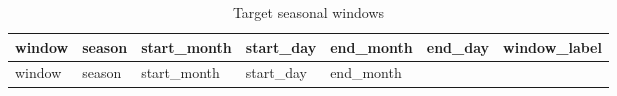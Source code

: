 \documentclass[
]{article}
\begin{document}
\begin{longtable}[]{@{}
  >{\raggedright\arraybackslash}p{}
  >{\raggedright\arraybackslash}p{}
  >{\raggedleft\arraybackslash}p{}
  >{\raggedleft\arraybackslash}p{}
  >{\raggedleft\arraybackslash}p{}
  >{\raggedleft\arraybackslash}p{}
  >{\raggedright\arraybackslash}p{}@{}}
\caption{Target seasonal windows}\tabularnewline
\toprule\noalign{}
\begin{minipage}[b]{\linewidth}\raggedright
window
\end{minipage} & \begin{minipage}[b]{\linewidth}\raggedright
season
\end{minipage} & \begin{minipage}[b]{\linewidth}\raggedleft
start\_month
\end{minipage} & \begin{minipage}[b]{\linewidth}\raggedleft
start\_day
\end{minipage} & \begin{minipage}[b]{\linewidth}\raggedleft
end\_month
\end{minipage} & \begin{minipage}[b]{\linewidth}\raggedleft
end\_day
\end{minipage} & \begin{minipage}[b]{\linewidth}\raggedright
window\_label
\end{minipage} \\
\midrule\noalign{}
\endfirsthead
\toprule\noalign{}
\begin{minipage}[b]{\linewidth}\raggedright
window
\end{minipage} & \begin{minipage}[b]{\linewidth}\raggedright
season
\end{minipage} & \begin{minipage}[b]{\linewidth}\raggedleft
start\_month
\end{minipage} & \begin{minipage}[b]{\linewidth}\raggedleft
start\_day
\end{minipage} & \begin{minipage}[b]{\linewidth}\raggedleft
end\_month
\end{minipage} & \begin{minipage}[b]{\linewidth}\raggedleft

\end{minipage}
\end{longtable}
\end{document}
